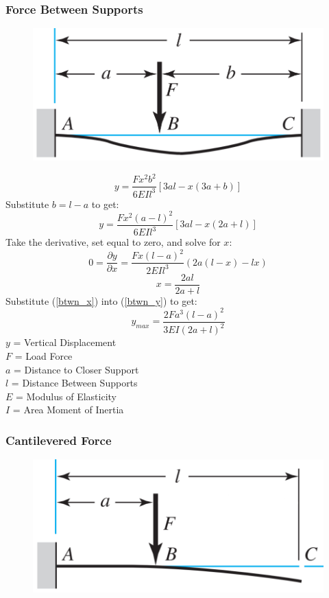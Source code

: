 \documentclass[11pt,a4paper,titlepage]{article}
\begin{document}
	\subsubsection{Force Between Supports}
	\begin{figure}[H]
		\centering
		\includegraphics[width=0.7\linewidth]{"Force_Btwn_Supports"}
	\end{figure}
	
	\begin{equation}
		y = \frac{F x^2 b^2}{6 EI l^3} [3al-x(3a+b)]
	\end{equation}
	Substitute $b=l-a$ to get:
	\begin{equation} \label{btwn_y}
		y = \frac{F x^2 (a-l)^2}{6 EI l^3} [3al-x(2a+l)]
	\end{equation}
	\newpage
	Take the derivative, set equal to zero, and solve for $x$:
	\begin{equation}
		0 = \frac{\partial y}{\partial x} = \frac{F x (l-a)^2}{2 EI l^3} (2a (l-x) - lx)
	\end{equation}
	\begin{equation} \label{btwn_x}
		x = \frac{2al}{2a + l}
	\end{equation}
	Substitute (\ref{btwn_x}) into (\ref{btwn_y}) to get:
	\begin{equation}
		y_{max} = \frac{2 F a^3 (l-a)^2}{3 EI (2a+l)^2}
	\end{equation}
	$y$ = Vertical Displacement \\
	$F$ = Load Force \\
	$a$ = Distance to Closer Support \\
	$l$ = Distance Between Supports \\
	$E$ = Modulus of Elasticity \\
	$I$ = Area Moment of Inertia
	
	\subsubsection{Cantilevered Force}
	\begin{figure}[H]
		\centering
		\includegraphics[width=0.7\linewidth]{"Cantilievered_Force"}
	\end{figure}
	
\end{document}
